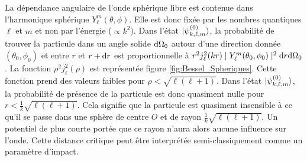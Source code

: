 La dépendance angulaire de l'onde sphérique libre est contenue dans l'harmonique sphérique $Y_{\ell}^{m}(\theta, \phi)$. Elle est donc fixée par les nombres quantiques $\ell$ et $m$ et non par l'énergie ($\propto k^2$). Dans l'état $\ket{\psi^{(0)}_{k,\ell,m}}$, la probabilité de trouver la particule dans un angle solide $\mathrm{d}\Omega_0$ autour d'une direction donnée $(\theta_0,\phi_0)$ et entre $r$ et $r+\mathrm{d} r$ est proportionnelle à  
$r^2 j_\ell^2 (kr) \mid Y_{\ell}^{m}(\theta_0, \phi_0) \mid ^2 \mathrm{d} r \mathrm{d} \Omega_0 $. La fonction $\rho^2 j_\ell^2(\rho)$ est représentée figure \ref{fig:Bessel_Spheriques}. Cette fonction prend des valeurs faibles pour $\rho < \sqrt{\ell(\ell+1)}$. Dans l'état $\ket{\psi^{(0)}_{k,\ell,m}}$, la probabilité de présence de la particule est donc quasiment nulle pour $r < \frac{1}{k} \sqrt{\ell(\ell+1)}$. Cela signifie que la particule est quasiment insensible à ce qu'il se passe dans une sphère de centre $O$ et de rayon $\frac{1}{k} \sqrt{\ell(\ell+1)}$. Un potentiel de plus courte portée que ce rayon n'aura alors aucune influence sur l'onde. Cette distance critique peut être interprétée semi-classiquement comme un paramètre d'impact.

